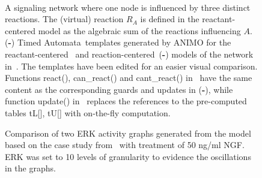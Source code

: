 \documentclass{bmcart}
\def\ta{Timed Automaton}
\def\tas{Timed Automata}
\begin{document}
\begin{backmatter}
\begin{figure}[htb]
  \begin{center}
   \qquad\qquad
   \\
   \qquad\qquad
   \qquad\qquad
  \end{center}
  \caption{
{\bf\protect{}} A signaling network where one node is influenced by three distinct reactions.
The (virtual) reaction $R_A$ is defined in
the reactant-centered model as the algebraic sum of the reactions influencing $A$.
({\bf\protect{}\--{}\protect{}}) \tas\ templates generated by ANIMO for the reactant-centered~{\bf\protect{}}
 and reaction-centered~({\bf\protect{}\--{}\protect{}}) models of the network in~{\bf\protect{}}.
The templates have been edited for an easier visual comparison. Functions {\sf react()}, {\sf can\_react()} and {\sf cant\_react()}
in~{\protect{}} have the same content as the corresponding guards and updates in ({\bf\protect{}\--{}\protect{}}),
while function {\sf update()} in~{\protect{}}
replaces the references to the pre-computed tables {\sf tL[]}, {\sf tU[]} with on-the-fly computation.
\label{fig:ta-models}}
\end{figure}



\begin{figure}[!htb]
\begin{center}
\end{center}
  \caption{Comparison of two ERK activity graphs generated from the model based on the case study from~\cite{animo-bibe} with treatment of 50 ng/ml NGF.
  ERK was set to 10 levels of granularity to evidence the oscillations in the graphs.
  \label{fig:comparison-graph-animo}}
\end{figure}


\end{backmatter}
\end{document}
